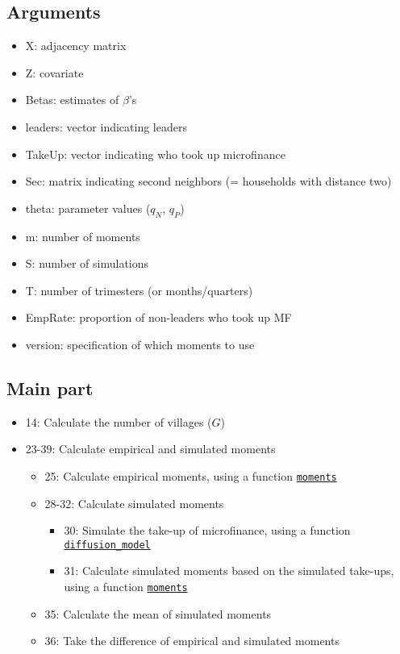 \documentclass[10pt,letterpaper]{article}
\begin{document}
\subsection*{Arguments}
\begin{itemize}
  \item X: adjacency matrix
  \item Z: covariate
  \item Betas: estimates of $\beta$'s 
  \item leaders: vector indicating leaders
  \item TakeUp: vector indicating who took up microfinance
  \item Sec: matrix indicating second neighbors (= households with distance two)
  \item theta: parameter values ($q_N$, $q_P$)
  \item m: number of moments
  \item S: number of simulations
  \item T: number of trimesters (or months/quarters)
  \item EmpRate: proportion of non-leaders who took up MF
  \item version: specification of which moments to use
\end{itemize}

\subsection*{Main part}
\begin{itemize}
  \item 14: Calculate the number of villages ($G$)
  \item 23-39: Calculate empirical and simulated moments
    \begin{itemize}
      \item 25: Calculate empirical moments, using a function \hyperref[moments]{\texttt{moments}}
      \item 28-32: Calculate simulated moments
        \begin{itemize}
          \item 30: Simulate the take-up of microfinance, using a function \hyperref[diffusion_model]{\texttt{diffusion\_model}}
          \item 31: Calculate simulated moments based on the simulated take-ups, using a function \hyperref[moments]{\texttt{moments}}
        \end{itemize}
      \item 35: Calculate the mean of simulated moments
      \item 36: Take the difference of empirical and simulated moments
    \end{itemize}
\end{itemize}
\end{document}
